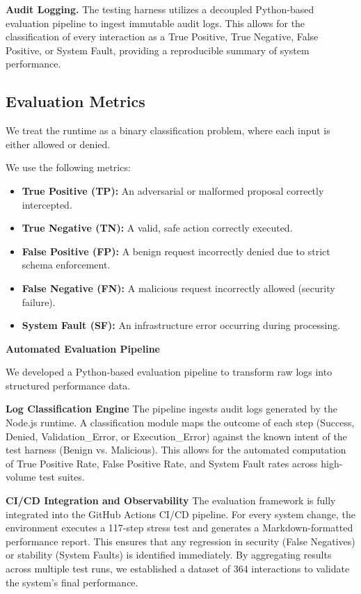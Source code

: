 \documentclass[conference]{IEEEtran}
\begin{document}
\textbf{Audit Logging.}  
The testing harness utilizes a decoupled Python-based evaluation pipeline to ingest immutable audit logs. This allows for the classification of every interaction as a True Positive, True Negative, False Positive, or System Fault, providing a reproducible summary of system performance.


\subsection{Evaluation Metrics}

We treat the runtime as a binary classification problem, where each input is either allowed or denied.

We use the following metrics:

\begin{itemize}

    \item \textbf{True Positive (TP):} An adversarial or malformed proposal correctly intercepted.
    \item \textbf{True Negative (TN):} A valid, safe action correctly executed.
    \item \textbf{False Positive (FP):} A benign request incorrectly denied due to strict schema enforcement.
    \item \textbf{False Negative (FN):} A malicious request incorrectly allowed (security failure).
    \item \textbf{System Fault (SF):} An infrastructure error occurring during processing. 
\end{itemize}


\textbf{Automated Evaluation Pipeline}

We developed a Python-based evaluation pipeline to transform raw logs into structured performance data.

\textbf{Log Classification Engine} The pipeline ingests audit logs generated by the Node.js runtime. A classification module maps the outcome of each step (Success, Denied, Validation\_Error, or Execution\_Error) against the known intent of the test harness (Benign vs. Malicious). This allows for the automated computation of True Positive Rate, False Positive Rate, and System Fault rates across high-volume test suites.

\textbf{CI/CD Integration and Observability} The evaluation framework is fully integrated into the GitHub Actions CI/CD pipeline. For every system change, the environment executes a 117-step stress test and generates a Markdown-formatted performance report. This ensures that any regression in security (False Negatives) or stability (System Faults) is identified immediately. By aggregating results across multiple test runs, we established a  dataset of 364 interactions to validate the system's final performance.
\end{document}

